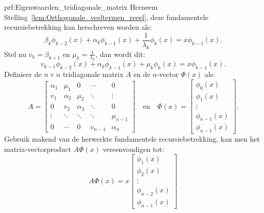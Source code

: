 \begin{prf}{prf:Eigenwaarden_tridiagonale_matrix}  
    Herneem Stelling~\ref{lem:Orthogonale_veeltermen_reeel}, deze fundamentele recursiebetrekking kan herschreven worden als:
    \begin{equation*}
        \beta_k\phi_{k-2}(x) + \alpha_k\phi_{k-1}(x) + \frac{1}{\lambda_k}\phi_k(x) = x\phi_{k-1}(x).
    \end{equation*}
    Stel nu $v_k = \beta_{k+1}$ en $\mu_k = \frac{1}{\lambda_k}$, dan wordt dit:
    \begin{equation*}
        v_{k-1}\phi_{k-2}(x) + \alpha_k\phi_{k-1}(x) + \mu_k\phi_k(x) = x\phi_{k-1}(x).
    \end{equation*}
    Definieer de $n \times n$ tridiagonale matrix $A$ en de $n$-vector $\Phi(x)$ als:
    \begin{equation*}
        A = \begin{bmatrix}
            \alpha_1 & \mu_1 & 0 & \cdots & 0 \\
            v_1 & \alpha_2 & \mu_2 & \ddots & \vdots \\
            0 & v_2 & \alpha_3 & \ddots & 0 \\
            \vdots & \ddots & \ddots & \ddots & \mu_{n-1} \\
            0 & \cdots & 0 & v_{n-1} & \alpha_n
        \end{bmatrix}
        \quad \text{en} \quad
        \Phi(x) = \begin{bmatrix}
            \phi_0(x) \\
            \phi_1(x) \\
            \vdots \\
            \phi_{n-1}(x) \\
            \phi_{n-1}(x)
        \end{bmatrix}.
    \end{equation*}
    Gebruik makend van de herwerkte fundamentele recursiebetrekking, kan men het matrix-vectorproduct $A\Phi(x)$ vereenvoudigen tot:
    \begin{equation*}
        A\Phi(x) = x\begin{bmatrix}
            \phi_1(x) \\
            \phi_2(x) \\
            \vdots \\
            \phi_{n-2}(x) \\
            \phi_{n-1}(x) 
        \end{bmatrix}

\end{equation*}
\end{prf}
